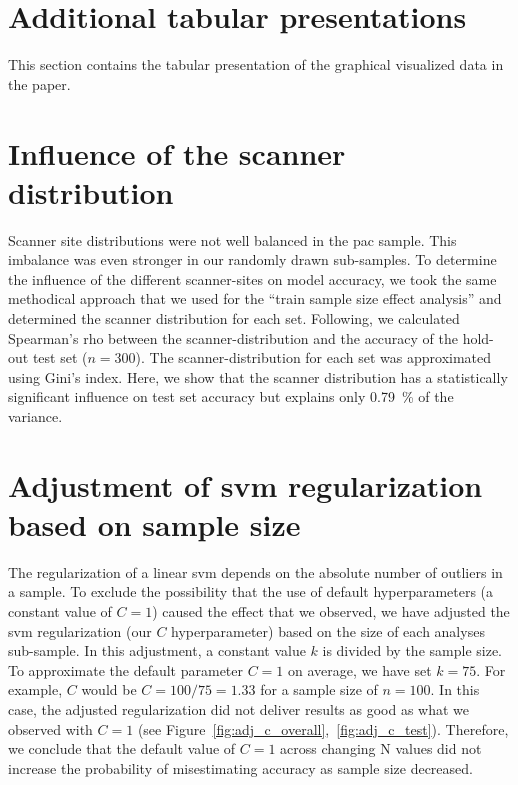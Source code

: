 \FloatBarrier


\section{Additional tabular presentations}
This section contains the tabular presentation of the graphical visualized data in the paper.


\FloatBarrier


\section{Influence of the scanner distribution}
\label{cha:influence-of-scanner-distribution}
Scanner site distributions were not well balanced in the \ac{pac} sample.
This imbalance was even stronger in our randomly drawn sub-samples. To determine the influence of the different scanner-sites on model accuracy, we took the same methodical approach that we used for the “train sample size effect analysis” and determined the scanner distribution for each set. Following, we calculated Spearman’s rho between the scanner-distribution and the accuracy of the hold-out test set ($n=300$). The scanner-distribution for each set was approximated using Gini’s index. Here, we show that the scanner distribution has a statistically significant influence on test set accuracy but explains only \SI{0.79}{\percent} of the variance.


\FloatBarrier


\section{Adjustment of \ac{svm} regularization based on sample size}
\label{cha:adjustment-svm-regularization}
The regularization of a linear \ac{svm} depends on the absolute number of outliers in a sample. To exclude the possibility that the use of default hyperparameters (a constant value of $C = 1$) caused the effect that we observed, we have adjusted the \ac{svm} regularization (our $C$ hyperparameter) based on the size of each analyses sub-sample. In this adjustment, a constant value $k$ is divided by the sample size. To approximate the default parameter $C=1$ on average, we have set $k=75$. For example, $C$ would be $C = 100/75 = \num{1.33}$ for a sample size of $n=100$. In this case, the adjusted regularization did not deliver results as good as what we observed with $C=1$ (see Figure~\ref{fig:adj_c_overall},~\ref{fig:adj_c_test}). Therefore, we conclude that the default value of $C=1$ across changing N values did not increase the probability of misestimating accuracy as sample size decreased.

